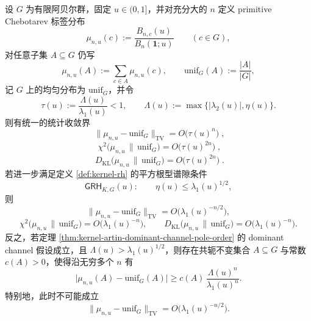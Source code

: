 \begin{theorem}\label{thm:kernel-chebotarev-statistical-convergence}
设 \(G\) 为有限阿贝尔群，固定 \(u\in(0,1]\)，并对充分大的 \(n\) 定义 primitive Chebotarev 标签分布
\[
\mu_{n,u}(c):=\frac{B_{n,c}(u)}{B_n(\mathbf{1};u)}
\qquad(c\in G),
\]
对任意子集 \(A\subseteq G\) 仍写
\[
\mu_{n,u}(A):=\sum_{c\in A}\mu_{n,u}(c),
\qquad
\mathrm{unif}_G(A):=\frac{|A|}{|G|},
\]
记 \(G\) 上的均匀分布为 \(\mathrm{unif}_G\)，并令
\[
\tau(u):=\frac{\Lambda(u)}{\lambda_1(u)}<1,
\qquad
\Lambda(u):=\max\{|\lambda_2(u)|,\eta(u)\}.
\]
则有统一的统计收敛界
\[
\boxed{\;
\|\mu_{n,u}-\mathrm{unif}_G\|_{\mathrm{TV}}
=
O\!\bigl(\tau(u)^n\bigr)\; },
\]
\[
\boxed{\;
\chi^2\!\bigl(\mu_{n,u}\,\|\,\mathrm{unif}_G\bigr)
=
O\!\bigl(\tau(u)^{2n}\bigr)\; },
\]
\[
\boxed{\;
D_{\mathrm{KL}}\!\bigl(\mu_{n,u}\,\|\,\mathrm{unif}_G\bigr)
=
O\!\bigl(\tau(u)^{2n}\bigr)\; }.
\]
若进一步满足定义 \ref{def:kernel-rh} 的平方根型谱隙条件
\[
\textsf{GRH}_{K,G}(u):\qquad \eta(u)\le \lambda_1(u)^{1/2},
\]
则
\[
\|\mu_{n,u}-\mathrm{unif}_G\|_{\mathrm{TV}}
=
O\!\bigl(\lambda_1(u)^{-n/2}\bigr),
\]
\[
\chi^2\!\bigl(\mu_{n,u}\,\|\,\mathrm{unif}_G\bigr)
=
O\!\bigl(\lambda_1(u)^{-n}\bigr),
\qquad
D_{\mathrm{KL}}\!\bigl(\mu_{n,u}\,\|\,\mathrm{unif}_G\bigr)
=
O\!\bigl(\lambda_1(u)^{-n}\bigr).
\]
反之，若定理 \ref{thm:kernel-artin-dominant-channel-pole-order} 的 dominant channel 假设成立，且 \(\Lambda(u)>\lambda_1(u)^{1/2}\)，则存在共轭不变集合 \(A\subseteq G\) 与常数 \(c(A)>0\)，使得沿无穷多个 \(n\) 有
\[
\bigl|\mu_{n,u}(A)-\mathrm{unif}_G(A)\bigr|
\ge
c(A)\,\frac{\Lambda(u)^n}{\lambda_1(u)^n}.
\]
特别地，此时不可能成立
\[
\|\mu_{n,u}-\mathrm{unif}_G\|_{\mathrm{TV}}
=
O\!\bigl(\lambda_1(u)^{-n/2}\bigr).
\]
\end{theorem}

